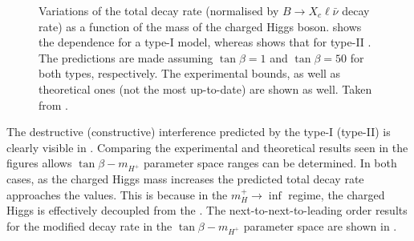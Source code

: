 \begin{figure}[htbp!]
    \centering
    \caption{\label{fig:xsgamma_br_2hdm} 
    Variations of the \BtoXsgamma total decay rate (normalised by $B\rightarrow X_c \ell\bar{\nu}$ decay rate) as a function of the mass of the charged Higgs boson.
     shows the dependence for a type-I \TwoHDM model, whereas  shows that for type-II \TwoHDM.
    The predictions are made assuming $\tan\beta=1$ and $\tan\beta=50$ for both types, respectively.
    The experimental bounds, as well as theoretical ones (not the most up-to-date) are shown as well.
    Taken from \cite{Misiak:2017bgg}.}
\end{figure}


The destructive (constructive) interference predicted by the type-I (type-II)  is clearly visible in .
Comparing the experimental and theoretical results seen in the figures allows $\tan\beta-m_{H^+}$ parameter space ranges can be determined.
In both cases, as the charged Higgs mass increases the predicted total decay rate approaches the \SM values.
This is because in the $m_H^+\rightarrow\inf$ regime, the charged Higgs is effectively decoupled from the \SM.
The next-to-next-to-leading order results for the modified \BtoXsgamma decay rate in the $\tan\beta-m_{H^+}$ parameter space are shown in .

